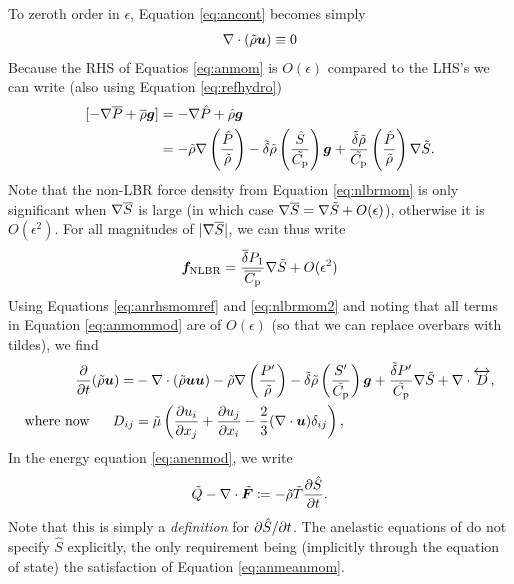 \documentclass[12pt]{article}
\newcommand{\vecf}{\bm{F}}
\newcommand{\deltaref}{\overline{\delta}}
\newcommand{\cpref}{\overline{\cpcap}}
\begin{document}
To zeroth order in $\epsilon$, Equation \eqref{eq:ancont} becomes simply
\begin{align}\label{eq:ancontref}
	\nabla\cdot(\tilde{\rho}\bm{u})\equiv0
\end{align}
Because the RHS of Equatios \eqref{eq:anmom} is $O(\epsilon)$ compared to the LHS's we can write (also using Equation \eqref{eq:refhydro})
\begin{align}\label{eq:anrhsmomref}
	[-\nabla \overline{P} + \overline{\rho}\bm{g}] &= -\nabla \hat{P} + \hat{\rho}\bm{g}\nonumber\\
	&= -\tilde{\rho}\nabla\left(\frac{\hat{P}}{\tilde{\rho}}\right) - \tilde{\delta} \tilde{\rho} \left(\frac{\hat{S}}{\tilde{C_{\rm{p}}}}\right) \bm{g} + \frac{\tilde{\delta}\tilde{\rho}}{\tilde{C_{\rm{p}}}} \left(\frac{\hat{P}}{\tilde{\rho}}\right)\nabla\tilde{S}.
\end{align}
Note that the non-LBR force density from Equation \eqref{eq:nlbrmom} is only significant when $\nabla\overline{S}$ is large (in which case $\nabla\overline{S}=\nabla\tilde{S}+O(\epsilon)$), otherwise it is $O(\epsilon^2)$. For all magnitudes of $|\nabla\overline{S}|$, we can thus write
\begin{align}\label{eq:nlbrmom2}
	\bm{f}_{\rm NLBR} = \frac{\deltaref P_1}{\cpref} \nabla\tilde{S} + O(\epsilon^2)
\end{align}
Using Equations \eqref{eq:anrhsmomref} and \eqref{eq:nlbrmom2} and noting that all terms in Equation \eqref{eq:anmommod} are of $O(\epsilon)$ (so that we can replace overbars with tildes), we find
\begin{subequations}\label{eq:anmomref}
	\begin{align}\label{eq:anmomrefmain}
	\frac{\partial}{\partial t}(\tilde{\rho}\bm{u})= &-\nabla\cdot(\tilde{\rho}\bm{u}\bm{u}) -\tilde{\rho}\nabla\left(\frac{P^\prime}{\tilde{\rho}}\right) - \tilde{\delta}\tilde{\rho} \left(\frac{S^\prime}{\tilde{C_{\rm{p}}}}\right) \bm{g} +\frac{\tilde{\delta} P^\prime}{\tilde{C_{\rm{p}}}} \nabla\tilde{S}+\nabla\cdot \overleftrightarrow{D},\\
	\text{where now}\ \ \ \ \  D_{ij}& = \tilde{\mu}\left(\frac{\partial u_i}{\partial x_j} + \frac{\partial u_j}{\partial x_i} - \frac{2}{3}(\nabla\cdot\bm{u})\delta_{ij}\right)\label{eq:anmomrefvisc},
\end{align}
\end{subequations}
In the energy equation \eqref{eq:anenmod}, we write 
\begin{align}\label{eq:dsdt}
	\tilde{Q} - \Div\tilde{\vecf} \define -\tilde{\rho}\tilde{T}\pderiv{\hat{S}}{t}.
\end{align}
Note that this is simply a \textit{definition} for $\partial\hat{S}/\partial t$. The anelastic equations of \citet{Gough1969} do not specify $\hat{S}$ explicitly, the only requirement being (implicitly through the equation of state) the satisfaction of Equation \eqref{eq:anmeanmom}. 
\end{document}
